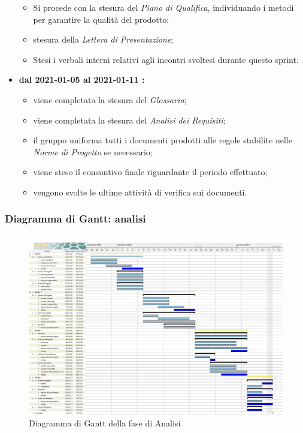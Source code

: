 \begin{itemize}
\begin{itemize}
		\item Si procede con la stesura del \textit{Piano di Qualifica}, individuando i metodi per garantire la qualità del prodotto;
		\item stesura della \textit{Lettera di Presentazione};
		\item Stesi i verbali interni relativi agli incontri svoltesi durante questo sprint.
	\end{itemize}
	\item \textbf{dal 2021-01-05 al 2021-01-11 :}
	\begin{itemize}
		\item viene completata la stesura del \textit{Glossario};
		\item viene completata la stesura del \textit{Analisi dei Requisiti};
		\item il gruppo uniforma tutti i documenti prodotti alle regole stabilite nelle \textit{Norme di Progetto} se necessario;
		\item viene steso il consuntivo finale riguardante il periodo effettuato;
		\item vengono svolte le ultime attività di verifica sui documenti.
	\end{itemize}
\end{itemize}

\subsubsection{Diagramma di Gantt: analisi}
\begin{figure}[H]
    \centering
    \includegraphics[scale = 0.25]{components/img/Analisi.png}
    \caption{Diagramma di Gantt della fase di Analisi}
    \label{fig:Diagramma di Gantt, fase di Analisi}
\end{figure}

